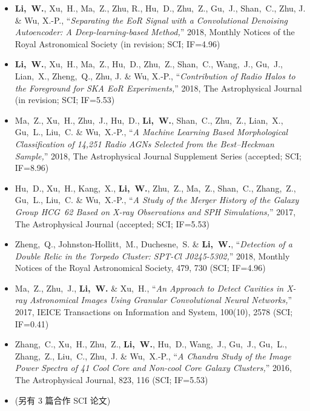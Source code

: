 \documentclass[zh]{resume}
\begin{document}
\begin{itemize}
  \small
  \item \textbf{Li,~W.}, Xu,~H., Ma,~Z., Zhu, R., Hu,~D., Zhu,~Z.,
    Gu,~J., Shan,~C., Zhu, J. \& Wu, X.-P.,
    \enquote{\it Separating the EoR Signal with a Convolutional Denoising
      Autoencoder: A Deep-learning-based Method,}
    2018, Monthly Notices of the Royal Astronomical Society
    (in revision; SCI; IF=4.96)
  \item \textbf{Li,~W.}, Xu,~H., Ma,~Z., Hu,~D., Zhu,~Z., Shan,~C.,
    Wang,~J., Gu,~J., Lian,~X., Zheng,~Q., Zhu, J. \& Wu, X.-P.,
    \enquote{\it Contribution of Radio Halos to the Foreground for
      SKA EoR Experiments,}
    2018, The Astrophysical Journal (in revision; SCI; IF=5.53)
  \item Ma,~Z., Xu,~H., Zhu,~J., Hu,~D., \textbf{Li,~W.}, Shan,~C., Zhu,~Z.,
    Lian,~X., Gu,~L., Liu,~C. \& Wu,~X.-P.,
    \enquote{\it A Machine Learning Based Morphological Classification
      of 14,251 Radio AGNs Selected from the Best--Heckman Sample,}
    2018, The Astrophysical Journal Supplement Series
    (accepted; SCI; IF=8.96)
  \item Hu,~D., Xu,~H., Kang,~X., \textbf{Li,~W.}, Zhu,~Z., Ma,~Z.,
    Shan,~C., Zhang,~Z., Gu,~L., Liu,~C. \& Wu,~X.-P.,
    \enquote{\it A Study of the Merger History of the Galaxy Group
      HCG~62 Based on X-ray Observations and SPH Simulations,}
    2017, The Astrophysical Journal
    (accepted; SCI; IF=5.53)
  \item Zheng,~Q., Johnston-Hollitt,~M., Duchesne,~S. \& \textbf{Li,~W.},
    \enquote{\it Detection of a Double Relic in the Torpedo Cluster:
      SPT-Cl J0245-5302,}
    2018, Monthly Notices of the Royal Astronomical Society, 479, 730
    (SCI; IF=4.96)
  \item Ma,~Z., Zhu,~J., \textbf{Li,~W.} \& Xu,~H.,
    \enquote{\it An Approach to Detect Cavities in X-ray Astronomical
      Images Using Granular Convolutional Neural Networks,}
    2017, IEICE Transactions on Information and System, 100(10), 2578
    (SCI; IF=0.41)
  \item Zhang,~C., Xu,~H., Zhu,~Z., \textbf{Li,~W.}, Hu,~D., Wang,~J.,
    Gu,~J., Gu,~L., Zhang,~Z., Liu,~C., Zhu,~J. \& Wu,~X.-P.,
    \enquote{\it A Chandra Study of the Image Power Spectra of 41
      Cool Core and Non-cool Core Galaxy Clusters,}
    2016, The Astrophysical Journal, 823, 116 (SCI; IF=5.53)
  \item (另有 3 篇合作 SCI 论文)
\end{itemize}
\end{document}
